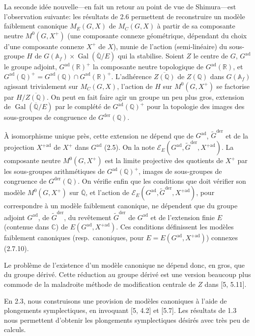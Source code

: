 \documentclass[12pt,a4paper]{article}
\theoremstyle{plain}
\theoremstyle{definition}
\theoremstyle{remark}
\DeclareMathOperator{\Gal}{Gal}
\newcommand{\QQ}{\mathbb{Q}}
\newcommand{\RR}{\mathbb{R}}
\newcommand{\CC}{\mathbb{C}}
\newcommand{\Af}{\mathbb{A}_f}
\begin{document}
La seconde id\'ee nouvelle---en fait un retour au point de vue de Shimura---est l'observation suivante: les r\'esultats de 2.6 permettent de reconstruire un mod\`ele faiblement canonique $M_E(G,X)$ de $M_C(G,X)$ \`a partir de sa composante neutre $M^0(G,X^+)$ (une composante connexe g\'eom\'etrique, d\'ependant du choix d'une composante connexe $X^+$ de $X$), munie de l'action (semi-lin\'eaire) du sous-groupe $H$ de $G(\Af) \times \Gal(\overline{\QQ}/E)$ qui la stabilise. Soient $Z$ le centre de $G$, $G^{\text{ad}}$ le groupe adjoint, $G^{\text{ad}}(\RR)^+$ la composante neutre topologique de $G^{\text{ad}}(\RR)$, et $G^{\text{ad}}(\QQ)^+ = G^{\text{ad}}(\QQ) \cap G^{\text{ad}}(\RR)^+$. L'adh\'erence $\overline{Z(\QQ)}$ de $Z(\QQ)$ dans $G(\Af)$ agissant trivialement sur $M_C(G,X)$, l'action de $H$ sur $M^0(G,X^+)$ se factorise par $H/\overline{Z(\QQ)}$. On peut en fait faire agir un groupe un peu plus gros, extension de $\Gal(\overline{\QQ}/E)$ par le compl\'et\'e de $G^{\text{ad}}(\QQ)^+$ pour la topologie des images des sous-groupes de congruence de $G^{\text{der}}(\QQ)$.

\`A isomorphisme unique pr\`es, cette extension ne d\'epend que de $G^{\text{ad}}$, $\tilde{G}^{\text{der}}$ et de la projection $X^{+\text{ad}}$ de $X^+$ dans $G^{\text{ad}}$ (2.5). On la note $\mathscr{E}_E(G^{\text{ad}},\tilde{G}^{\text{der}},X^{+\text{ad}})$. La composante neutre $M^0(G,X^+)$ est la limite projective des quotients de $X^+$ par les sous-groupes arithm\'etiques de $G^{\text{ad}}(\QQ)^+$, images de sous-groupes de congruence de $G^{\text{der}}(\QQ)$. On v\'erifie enfin que les conditions que doit v\'erifier son mod\`ele $M^0(G,X^+)$ sur $\overline{\QQ}$, et l'action de $\mathscr{E}_E(G^{\text{ad}},\tilde{G}^{\text{der}},X^{+\text{ad}})$, pour correspondre \`a un mod\`ele faiblement canonique, ne d\'ependent que du groupe adjoint $G^{\text{ad}}$, de $\tilde{G}^{\text{der}}$, du rev\^etement $\tilde{G}^{\text{der}}$ de $G^{\text{ad}}$ et de l'extension finie $E$ (contenue dans $\CC$) de $E(G^{\text{ad}},X^{+\text{ad}})$. Ces conditions d\'efinissent les mod\`eles faiblement canoniques (resp.~canoniques, pour $E = E(G^{\text{ad}},X^{+\text{ad}})$) connexes (2.7.10).

Le probl\`eme de l'existence d'un mod\`ele canonique ne d\'epend donc, en gros, que du groupe d\'eriv\'e. Cette r\'eduction au groupe d\'eriv\'e est une version beaucoup plus commode de la maladroite m\'ethode de modification centrale de $Z$ dans [5, 5.11].

En 2.3, nous construisons une provision de mod\`eles canoniques \`a l'aide de plongements symplectiques, en invoquant [5, 4.2] et [5.7]. Les r\'esultats de 1.3 nous permettent d'obtenir les plongements symplectiques d\'esir\'es avec tr\`es peu de calculs.
\end{document}
